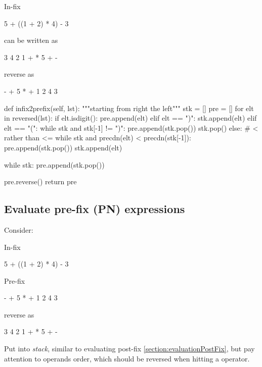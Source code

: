 In-fix
\begin{python}
5 + ((1 + 2) * 4) - 3
\end{python}

can be written as
\begin{python}
3 4 2 1 + * 5 + -
\end{python}

reverse as 
\begin{python}
- + 5 * + 1 2 4 3
\end{python}

\begin{python}
  def infix2prefix(self, lst):
    """starting from right the left"""
    stk = []
    pre = []
    for elt in reversed(lst):
      if elt.isdigit():
        pre.append(elt)
      elif elt == ")":
        stk.append(elt)
      elif elt == "(":
        while stk and stk[-1] != ")":
          pre.append(stk.pop())
        stk.pop()
      else:
        # < rather than <=
        while stk and precdn(elt) < precdn(stk[-1]):  
          pre.append(stk.pop())
        stk.append(elt)

    while stk:
      pre.append(stk.pop())

    pre.reverse()
    return pre
\end{python}


\subsection{Evaluate pre-fix (PN) expressions}
Consider: 

In-fix
\begin{python}
5 + ((1 + 2) * 4) - 3
\end{python}

Pre-fix
\begin{python}
- + 5 * + 1 2 4 3
\end{python}

reverse as 
\begin{python}
3 4 2 1 + * 5 + -
\end{python}
Put into \textit{stack}, similar to evaluating post-fix \ref{section:evaluationPostFix}, but pay attention to operands order, which should be reversed when hitting a operator. 
